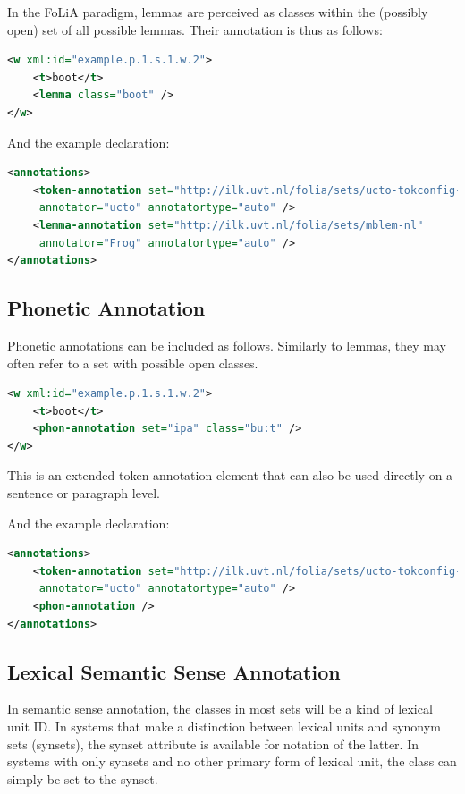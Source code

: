 \documentclass[a4paper,12pt]{report}
\begin{document}
In the FoLiA paradigm, lemmas are perceived as classes within the (possibly open) set of all possible lemmas. Their annotation is thus as follows:

\begin{lstlisting}[language=xml]
<w xml:id="example.p.1.s.1.w.2">
    <t>boot</t>
    <lemma class="boot" />
</w>
\end{lstlisting}

And the example declaration:

\begin{lstlisting}[language=xml]
<annotations>
    <token-annotation set="http://ilk.uvt.nl/folia/sets/ucto-tokconfig-nl" 
     annotator="ucto" annotatortype="auto" />
    <lemma-annotation set="http://ilk.uvt.nl/folia/sets/mblem-nl"
     annotator="Frog" annotatortype="auto" />
</annotations>
\end{lstlisting}

\subsection{Phonetic Annotation}

Phonetic annotations can be included as follows. Similarly to lemmas, they may often refer to a set with possible open classes.

\begin{lstlisting}[language=xml]
<w xml:id="example.p.1.s.1.w.2">
    <t>boot</t>
    <phon-annotation set="ipa" class="bu:t" />
</w>
\end{lstlisting}

This is an extended token annotation element that can also be used directly on a sentence or paragraph level.

And the example declaration:

\begin{lstlisting}[language=xml]
<annotations>
    <token-annotation set="http://ilk.uvt.nl/folia/sets/ucto-tokconfig-nl" 
     annotator="ucto" annotatortype="auto" />
    <phon-annotation />
</annotations>
\end{lstlisting}

\subsection{Lexical Semantic Sense Annotation}

In semantic sense annotation, the classes in most sets will be a kind of lexical unit ID. In systems that make a distinction between lexical units and synonym sets (synsets), the synset attribute is available for notation of the latter. In systems with only synsets and no other primary form of lexical unit, the class can simply be set to the synset.
\end{document}
